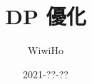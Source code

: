 \documentclass[aspectratio=169]{beamer}
\title{DP 優化}
\author{WiwiHo}
\date{2021-??-??}
\begin{document}
    \begin{frame}
        \titlepage
    \end{frame}
\end{document}
